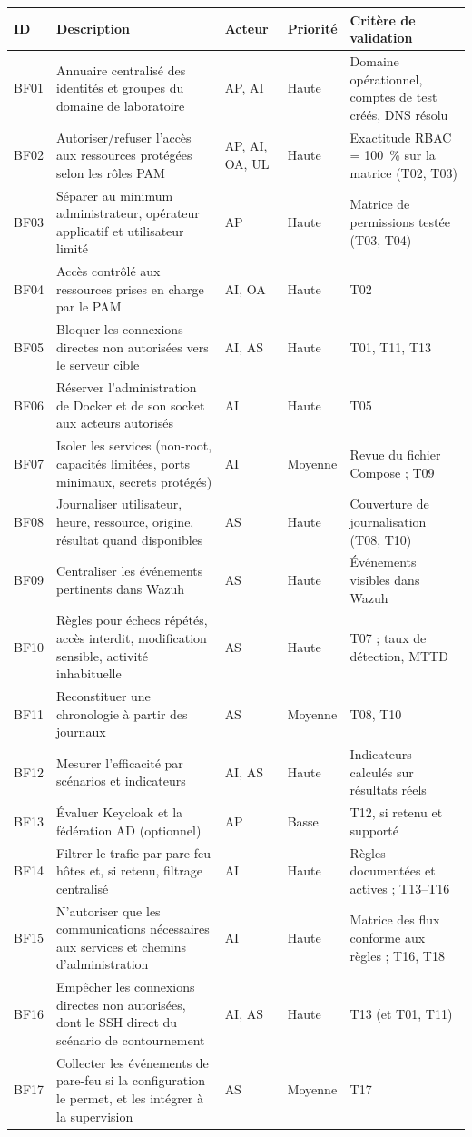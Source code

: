 \documentclass[11pt,a4paper]{report}
\begin{document}
\begin{longtable}{@{}p{1.2cm}p{5.2cm}p{1.8cm}p{1.4cm}p{4.6cm}@{}}
\toprule\textbf{ID} & \textbf{Description} & \textbf{Acteur} & \textbf{Priorité} & \textbf{Critère de validation}\\ \midrule\endhead
BF01 & Annuaire centralisé des identités et groupes du domaine de laboratoire & AP, AI & Haute & Domaine opérationnel, comptes de test créés, DNS résolu\\
BF02 & Autoriser/refuser l'accès aux ressources protégées selon les rôles PAM & AP, AI, OA, UL & Haute & Exactitude RBAC = 100~\% sur la matrice (T02, T03)\\
BF03 & Séparer au minimum administrateur, opérateur applicatif et utilisateur limité & AP & Haute & Matrice de permissions testée (T03, T04)\\
BF04 & Accès contrôlé aux ressources prises en charge par le PAM & AI, OA & Haute & T02\\
BF05 & Bloquer les connexions directes non autorisées vers le serveur cible & AI, AS & Haute & T01, T11, T13\\
BF06 & Réserver l'administration de Docker et de son socket aux acteurs autorisés & AI & Haute & T05\\
BF07 & Isoler les services (non-root, capacités limitées, ports minimaux, secrets protégés) & AI & Moyenne & Revue du fichier Compose ; T09\\
BF08 & Journaliser utilisateur, heure, ressource, origine, résultat quand disponibles & AS & Haute & Couverture de journalisation (T08, T10)\\
BF09 & Centraliser les événements pertinents dans Wazuh & AS & Haute & Événements visibles dans Wazuh\\
BF10 & Règles pour échecs répétés, accès interdit, modification sensible, activité inhabituelle & AS & Haute & T07 ; taux de détection, MTTD\\
BF11 & Reconstituer une chronologie à partir des journaux & AS & Moyenne & T08, T10\\
BF12 & Mesurer l'efficacité par scénarios et indicateurs & AI, AS & Haute & Indicateurs calculés sur résultats réels\\
BF13 & Évaluer Keycloak et la fédération AD (optionnel) & AP & Basse & T12, si retenu et supporté\\
BF14  & Filtrer le trafic par pare-feu hôtes et, si retenu, filtrage centralisé & AI & Haute & Règles documentées et actives ; T13--T16\\
BF15  & N'autoriser que les communications nécessaires aux services et chemins d'administration & AI & Haute & Matrice des flux conforme aux règles ; T16, T18\\
BF16  & Empêcher les connexions directes non autorisées, dont le SSH direct du scénario de contournement & AI, AS & Haute & T13 (et T01, T11)\\
BF17  & Collecter les événements de pare-feu si la configuration le permet, et les intégrer à la supervision & AS & Moyenne & T17\\
\bottomrule
\end{longtable}
\normalsize
\end{document}
